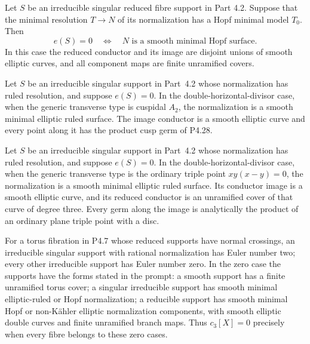\begin{proposition}[P4.27]\hypertarget{tag-02WZ}{}\label{night:P4.27}\label{stmt:P4.27}


Let \(S\) be an irreducible singular reduced fibre support in Part 4.2.
Suppose that the minimal resolution \(T\to N\) of its normalization has a
Hopf minimal model \(T_0\). Then
\[
 e(S)=0\quad\Longleftrightarrow\quad
 N\text{ is a smooth minimal Hopf surface}.
\]
In this case the reduced conductor and its image are disjoint unions of
smooth elliptic curves, and all component maps are finite unramified covers.
\end{proposition}

\begin{proposition}[P4.29]\hypertarget{tag-02X1}{}\label{night:P4.29}\label{stmt:P4.29}


Let $S$ be an irreducible singular support
in Part~4.2 whose normalization has ruled
resolution, and suppose $e(S)=0$.
In the double-horizontal-divisor case,
when the generic transverse type is
cuspidal $A_2$, the normalization is
a smooth minimal elliptic ruled surface.
The image conductor is a smooth elliptic
curve and every point along it has the
product cusp germ of P4.28.
\end{proposition}

\begin{proposition}[P4.31]\hypertarget{tag-02X4}{}\label{night:P4.31}\label{stmt:P4.31}


Let $S$ be an irreducible singular support in Part~4.2 whose
normalization has ruled resolution, and suppose $e(S)=0$.
In the double-horizontal-divisor case, when the generic
transverse type is the ordinary triple point $xy(x-y)=0$,
the normalization is a smooth minimal elliptic ruled surface.
Its conductor image is a smooth elliptic curve, and its
reduced conductor is an unramified cover of that curve of
degree three. Every germ along the image is analytically
the product of an ordinary plane triple point with a disc.
\end{proposition}

\begin{proposition}[P4.8]\hypertarget{tag-02Y0}{}\label{night:P4.8}\label{stmt:P4.8}


For a torus fibration in P4.7 whose reduced supports have normal
crossings, an irreducible singular support with
rational normalization has Euler number two; every other irreducible
support has Euler number zero. In the zero case the supports have the
forms stated in the prompt: a smooth support has a finite unramified
torus cover; a singular irreducible support has smooth minimal
elliptic-ruled or Hopf normalization; a reducible support has smooth
minimal Hopf or non-Kähler elliptic normalization components, with
smooth elliptic double curves and finite unramified branch maps.
Thus $c_3[X]=0$ precisely when every fibre belongs to these zero cases.
\end{proposition}

